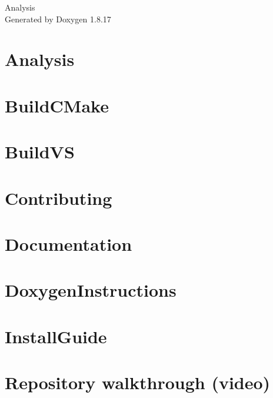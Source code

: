 \let\mypdfximage\pdfximage\def\pdfximage{\immediate\mypdfximage}\documentclass[twoside]{book}
\newcommand{\+}{\discretionary{\mbox{\scriptsize$\hookleftarrow$}}{}{}}
\newcommand{\clearemptydoublepage}{%
  \newpage{\pagestyle{empty}\cleardoublepage}%
}
\begin{document}
\hypersetup{pageanchor=false,
             bookmarksnumbered=true,
             pdfencoding=unicode
            }
\begin{titlepage}
\vspace*{7cm}
\begin{center}%
{\Large Analysis }\\
\vspace*{1cm}
{\large Generated by Doxygen 1.8.17}\\
\end{center}
\end{titlepage}
\clearemptydoublepage
{}
\tableofcontents
\clearemptydoublepage
{}
\hypersetup{pageanchor=true}

\chapter{Analysis}
\label{index}\hypertarget{index}{}
\chapter{Build\+C\+Make}
\label{a02878}

\chapter{Build\+VS}
\label{a02879}

\chapter{Contributing}
\label{a02880}

\chapter{Documentation}
\label{a02881}

\chapter{Doxygen\+Instructions}
\label{a02882}

\chapter{Install\+Guide}
\label{a02883}

\chapter{Repository walkthrough (video)}
\label{a02884}

\end{document}
